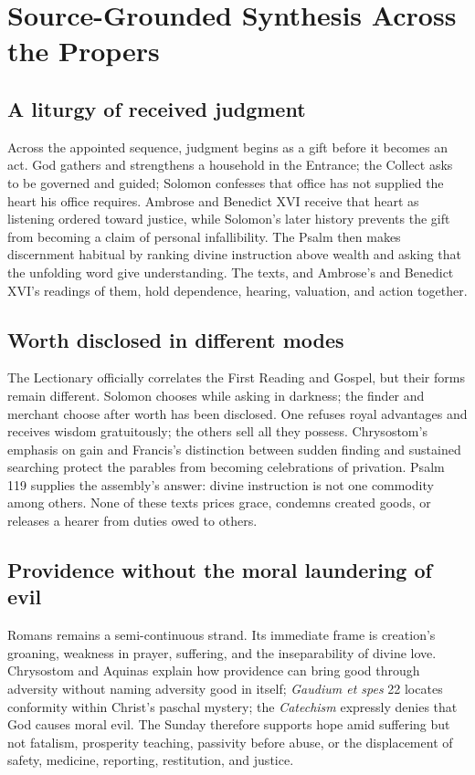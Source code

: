 \section*{Source-Grounded Synthesis Across the Propers}

\subsection*{A liturgy of received judgment}

Across the appointed sequence, judgment begins as a gift before it becomes an
act. God gathers and strengthens a household in the Entrance; the Collect asks
to be governed and guided; Solomon confesses that office has not supplied the
heart his office requires. Ambrose and Benedict XVI receive that heart as
listening ordered toward justice, while Solomon's later history prevents the
gift from becoming a claim of personal infallibility. The Psalm then makes
discernment habitual by ranking divine instruction above wealth and asking
that the unfolding word give understanding. The texts, and Ambrose's
and Benedict XVI's readings of them, hold dependence, hearing, valuation, and
action together.

\subsection*{Worth disclosed in different modes}

The Lectionary officially correlates the First Reading and Gospel, but their
forms remain different. Solomon chooses while asking in darkness; the finder
and merchant choose after worth has been disclosed. One refuses royal
advantages and receives wisdom gratuitously; the others sell all they possess.
Chrysostom's emphasis on gain and Francis's distinction between sudden finding
and sustained searching protect the parables from becoming celebrations of
privation. Psalm 119 supplies the assembly's answer: divine instruction is not
one commodity among others. None of these texts prices grace, condemns created
goods, or releases a hearer from duties owed to others.

\subsection*{Providence without the moral laundering of evil}

Romans remains a semi-continuous strand. Its immediate frame is creation's
groaning, weakness in prayer, suffering, and the inseparability of divine
love. Chrysostom and Aquinas explain how providence can bring good through
adversity without naming adversity good in itself; \emph{Gaudium et spes} 22
locates conformity within Christ's paschal mystery; the \emph{Catechism}
expressly denies that God causes moral evil. The Sunday therefore supports
hope amid suffering but not fatalism, prosperity teaching, passivity before
abuse, or the displacement of safety, medicine, reporting, restitution, and
justice.

